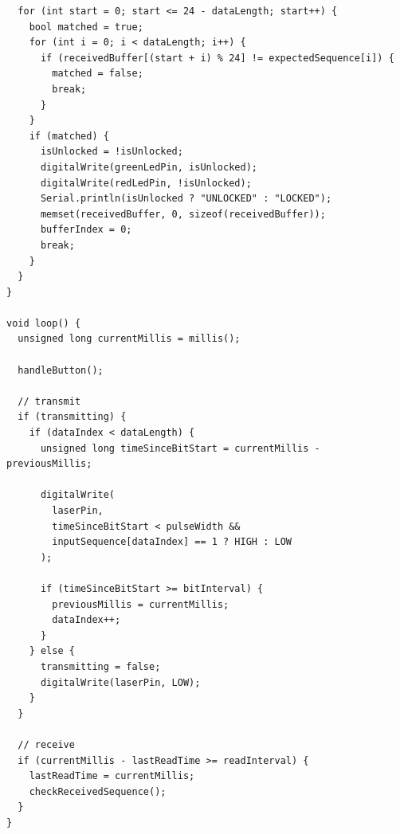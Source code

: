 \documentclass[12pt,a4paper]{article}
\begin{document}
\begin{verbatim}
  for (int start = 0; start <= 24 - dataLength; start++) {
    bool matched = true;
    for (int i = 0; i < dataLength; i++) {
      if (receivedBuffer[(start + i) % 24] != expectedSequence[i]) {
        matched = false;
        break;
      }
    }
    if (matched) {
      isUnlocked = !isUnlocked;
      digitalWrite(greenLedPin, isUnlocked);
      digitalWrite(redLedPin, !isUnlocked);
      Serial.println(isUnlocked ? "UNLOCKED" : "LOCKED");
      memset(receivedBuffer, 0, sizeof(receivedBuffer));
      bufferIndex = 0;
      break;
    }
  }
}

void loop() {
  unsigned long currentMillis = millis();

  handleButton();

  // transmit
  if (transmitting) {
    if (dataIndex < dataLength) {
      unsigned long timeSinceBitStart = currentMillis - previousMillis;

      digitalWrite(
        laserPin,
        timeSinceBitStart < pulseWidth &&
        inputSequence[dataIndex] == 1 ? HIGH : LOW
      );

      if (timeSinceBitStart >= bitInterval) {
        previousMillis = currentMillis;
        dataIndex++;
      }
    } else {
      transmitting = false;
      digitalWrite(laserPin, LOW);
    }
  }

  // receive
  if (currentMillis - lastReadTime >= readInterval) {
    lastReadTime = currentMillis;
    checkReceivedSequence();
  }
}
\end{verbatim}
\end{document}
